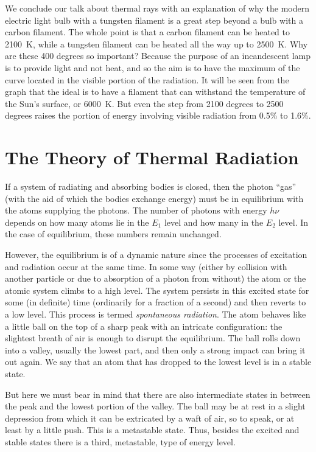 We conclude our talk about thermal rays with an explanation of why the modern electric light bulb with a tungsten filament is a great step beyond a bulb with a carbon filament. The whole point is that a carbon filament can be heated to \SI{2100}{\kelvin}, while a tungsten filament can be heated all the way up to \SI{2500}{\kelvin}. Why are these 400 degrees so important? Because the purpose of an incandescent lamp is to provide light and not heat, and so the aim is to have the maximum of the curve located in the visible portion of the radiation. It will
be seen from the graph that the ideal is to have a filament that can withstand the temperature of the Sun's surface, or \SI{6000}{\kelvin}. But even the step from 2100 degrees to 2500 degrees raises the portion of energy involving visible radiation from 0.5\% to 1.6\%.

\section{The Theory of Thermal Radiation}
If a system of radiating and absorbing bodies is closed, then the photon ``gas'' (with the aid of which the bodies exchange energy) must be in equilibrium with the atoms supplying the photons. The number of photons with energy $h\nu$ depends on how many atoms lie in the $E_{1}$ level and how many in the $E_{2}$ level. In the case of equilibrium, these numbers remain unchanged.

However, the equilibrium is of a dynamic nature since the processes of excitation and radiation occur at the same time. In some way (either by collision with another particle or due to absorption of a photon from without) the atom or the atomic system climbs to a high level. The system persists in this excited state for some (in definite) time (ordinarily for a fraction of a second) and then reverts to a low level. This process is termed \emph{spontaneous radiation}. The atom behaves like a little ball on the top of a sharp peak with an intricate configuration: the slightest breath of air is enough to disrupt the equilibrium. The ball rolls down into a valley, usually the lowest part, and then only a strong impact can bring it out again. We say that an atom that has dropped to the lowest level is in a stable state.

But here we must bear in mind that there are also intermediate states in between the peak and the lowest portion of the valley. The ball may be at rest in a slight depression from which it can be extricated by a waft of air, so to speak, or at least by a little push. This is a metastable state. Thus, besides the excited and stable states there is a third, metastable, type of energy level.

